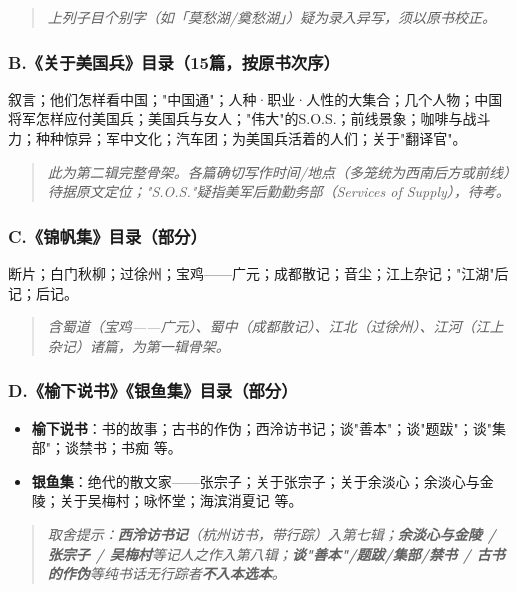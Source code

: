 \documentclass[UTF8,fontset=none,zihao=-4,a4paper]{ctexart}
\begin{document}
\begin{quote}\small\itshape
上列子目个别字（如「莫愁湖/奠愁湖」）疑为录入异写，须以原书校正。
\end{quote}

\subsubsection{B.《关于美国兵》目录（15篇，按原书次序）}

叙言；他们怎样看中国；"中国通"；人种·职业·人性的大集合；几个人物；中国将军怎样应付美国兵；美国兵与女人；"伟大"的S.O.S.；前线景象；咖啡与战斗力；种种惊异；军中文化；汽车团；为美国兵活着的人们；关于"翻译官"。

\begin{quote}\small\itshape
此为第二辑完整骨架。各篇确切写作时间/地点（多笼统为西南后方或前线）待据原文定位；"S.O.S."疑指美军后勤勤务部（Services of Supply），待考。
\end{quote}

\subsubsection{C.《锦帆集》目录（部分）}

断片；白门秋柳；过徐州；宝鸡——广元；成都散记；音尘；江上杂记；"江湖"后记；后记。

\begin{quote}\small\itshape
含蜀道（宝鸡——广元）、蜀中（成都散记）、江北（过徐州）、江河（江上杂记）诸篇，为第一辑骨架。
\end{quote}

\subsubsection{D.《榆下说书》《银鱼集》目录（部分）}

\begin{itemize}
\item \textbf{榆下说书}：书的故事；古书的作伪；西泠访书记；谈"善本"；谈"题跋"；谈"集部"；谈禁书；书痴 等。
\item \textbf{银鱼集}：绝代的散文家——张宗子；关于张宗子；关于余淡心；余淡心与金陵；关于吴梅村；咏怀堂；海滨消夏记 等。
\end{itemize}

\begin{quote}\small\itshape
取舍提示：\textbf{西泠访书记}（杭州访书，带行踪）入第七辑；\textbf{余淡心与金陵 / 张宗子 / 吴梅村}等记人之作入第八辑；\textbf{谈"善本"/题跋/集部/禁书 / 古书的作伪}等纯书话无行踪者\textbf{不入本选本}。
\end{quote}
\end{document}
